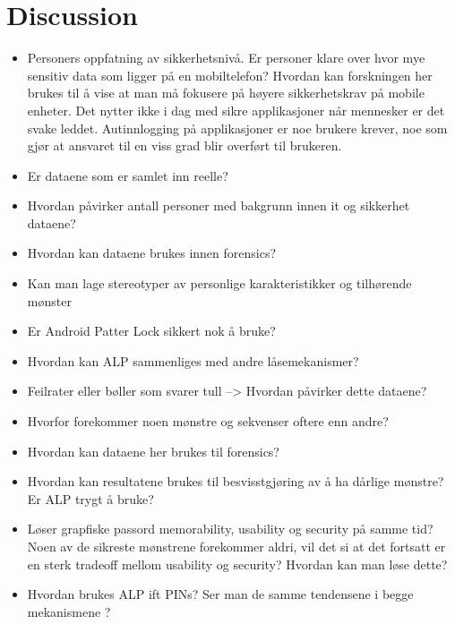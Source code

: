 \chapter{Discussion}\label{chap:discussion}


	\begin{itemize}
		\item Personers oppfatning av sikkerhetsnivå. Er personer klare over hvor mye sensitiv data som ligger på en mobiltelefon? Hvordan kan forskningen her brukes til å vise at man må fokusere på høyere sikkerhetskrav på mobile enheter. Det nytter ikke i dag med sikre applikasjoner når mennesker er det svake leddet. Autinnlogging på applikasjoner er noe brukere krever, noe som gjør at ansvaret til en viss grad blir overført til brukeren.
		\item Er dataene som er samlet inn reelle? 
		\item Hvordan påvirker antall personer med bakgrunn innen it og sikkerhet dataene?
		\item Hvordan kan dataene brukes innen forensics?
		\item Kan man lage stereotyper av personlige karakteristikker og tilhørende mønster
		\item Er Android Patter Lock sikkert nok å bruke?
		\item Hvordan kan ALP sammenliges med andre låsemekanismer?
		\item Feilrater eller bøller som svarer tull --> Hvordan påvirker dette dataene?
		\item Hvorfor forekommer noen mønstre og sekvenser oftere enn andre?
		\item Hvordan kan dataene her brukes til forensics?
		\item Hvordan kan resultatene brukes til besvisstgjøring av å ha dårlige mønstre? Er ALP trygt å bruke?
		\item Løser grapfiske passord memorability, usability og security på samme tid? Noen av de sikreste mønstrene forekommer aldri, vil det si at det fortsatt er en sterk tradeoff mellom usability og security? Hvordan kan man løse dette?
		\item Hvordan brukes ALP ift PINs? Ser man de samme tendensene i begge mekanismene ?
		
	\end{itemize}

